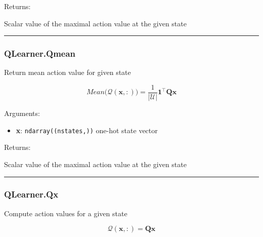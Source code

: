 Returns:

Scalar value of the maximal action value at the given state

\begin{center}\rule{0.5\linewidth}{\linethickness}\end{center}

\subsubsection{QLearner.Qmean}\label{qlearner.qmean}

\begin{Shaded}
\begin{Highlighting}[]
\end{Highlighting}
\end{Shaded}

Return mean action value for given state

\[
Mean \big(\mathcal Q(\mathbf x, :)\big) = \frac{1}{|\mathcal U|} \mathbf 1^\top \mathbf Q \mathbf x
\]

Arguments:

\begin{itemize}
\tightlist
\item
  \textbf{x}: \texttt{ndarray((nstates,))} one-hot state vector
\end{itemize}

Returns:

Scalar value of the maximal action value at the given state

\begin{center}\rule{0.5\linewidth}{\linethickness}\end{center}

\subsubsection{QLearner.Qx}\label{qlearner.qx}

\begin{Shaded}
\begin{Highlighting}[]
\end{Highlighting}
\end{Shaded}

Compute action values for a given state

\[
\mathcal Q(\mathbf x, :) = \mathbf Q \mathbf x
\]

